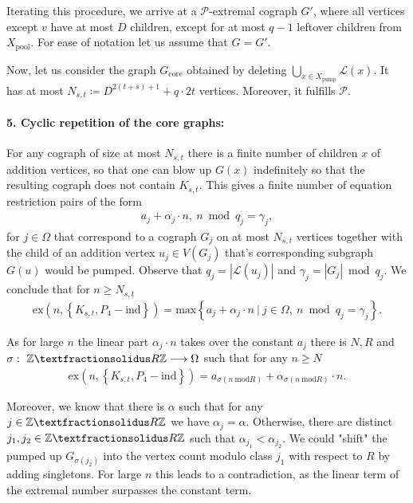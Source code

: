 \documentclass{article}
\newcommand{\ZZ}{\mathbb{Z}}
\theoremstyle{definition}
\theoremstyle{definition}
\theoremstyle{definition}
\theoremstyle{definition}
\theoremstyle{definition}
\theoremstyle{definition}
\theoremstyle{definition}
\theoremstyle{definition}
\theoremstyle{definition}
\theoremstyle{definition}
\begin{document}
    Iterating this procedure, we arrive at a $\mathscr{P}$-extremal cograph $G'$, where all vertices except $v$ have at most $D$ children, except for at most $q-1$ leftover children from $X_{\text{pool}}$.
    For ease of notation let us assume that $G=G'$.
    
    Now, let us consider the graph $G_{\text{core}}$ obtained by deleting $\bigcup_{x \in X_{\text{pump}}} \mathscr{L}(x)$.
    It has at most $N_{s,t} \coloneqq D^{2(t+s)+1} + q \cdot 2t$ vertices.
    Moreover, it fulfills $\mathscr{P}$.

    \paragraph{5. Cyclic repetition of the core graphs:}
    For any cograph of size at most $N_{s,t}$ there is a finite number of children $x$ of addition vertices, so that one can blow up $G(x)$ indefinitely so that the resulting cograph does not contain $K_{s,t}$.
    This gives a finite number of equation restriction pairs of the form
    \begin{align}
        a_j + \alpha_j \cdot n, \ n \bmod q_j = \gamma_j,
    \end{align}
    for $j \in \Omega$ that correspond to a cograph $G_j$ on at most $N_{s,t}$ vertices together with the child of an addition vertex $u_j \in V(G_j)$ that's corresponding subgraph $G(u)$ would be pumped. Observe that $q_j = |\mathscr{L}(u_j)|$ and $\gamma_j = |G_j| \bmod q_j$.
    We conclude that for $n \geq N_{s,t}$
    \begin{align}
        \text{ex}\left( n, \left\{ K_{s,t}, P_4 - \text{ind} \right\} \right) = \text{max} \left\{ a_j + \alpha_j \cdot n \ | \ j \in \Omega, \ n \bmod q_j = \gamma_j \right\}.
    \end{align}

    As for large $n$ the linear part $\alpha_j \cdot n$ takes over the constant $a_j$ there is $N, R$ and $\sigma: \ \ZZ \textfractionsolidus R\ZZ \longrightarrow \Omega$ such that for any $n \geq N$
    \begin{align}
        \text{ex}\left( n, \left\{ K_{s,t}, P_4 - \text{ind} \right\} \right) = a_{\sigma(n \ \text{mod} R)} + \alpha_{\sigma(n \ \text{mod} R)} \cdot n.
    \end{align}

    Moreover, we know that there is $\alpha$ such that for any $j \in \ZZ \textfractionsolidus R \ZZ$ we have $\alpha_j = \alpha$. Otherwise, there are distinct $j_1, j_2 \in \ZZ \textfractionsolidus R \ZZ$ such that $\alpha_{j_1} < \alpha_{j_2}$. We could "shift" the pumped up $G_{\sigma(j_2)}$ into the vertex count modulo class $j_1$ with respect to $R$ by adding singletons. For large $n$ this leads to a contradiction, as the linear term of the extremal number surpasses the constant term.
\end{document}
